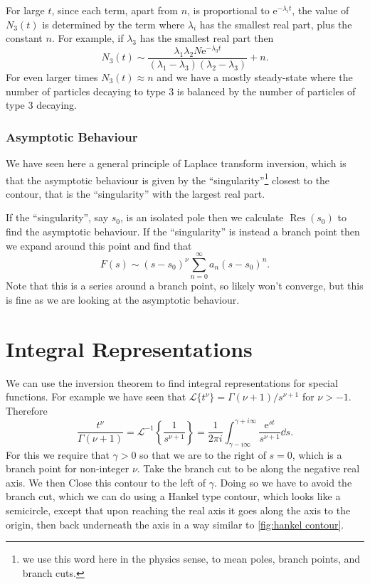 \documentclass[fleqn]{NotesClass}
\newcommand*{\e}{\mathrm{e}}
\DeclareMathOperator{\Res}{Res}
\newcommand*{\laplaceTransform}{\mathcal{L}}
\newcommand*{\inverseLaplaceTransform}{\laplaceTransform^{-1}}
\begin{document}
    For large \(t\), since each term, apart from \(n\), is proportional to \(\e^{-\lambda_it}\), the value of \(N_3(t)\) is determined by the term where \(\lambda_i\) has the smallest real part, plus the constant \(n\).
    For example, if \(\lambda_3\) has the smallest real part then 
    \begin{equation}
        N_3(t) \sim \frac{\lambda_1\lambda_2N\e^{-\lambda_3t}}{(\lambda_1 - \lambda_3)(\lambda_2 - \lambda_3)} + n.
    \end{equation}
    For even larger times \(N_3(t) \approx n\) and we have a mostly steady-state where the number of particles decaying to type 3 is balanced by the number of particles of type 3 decaying.
    
    \subsubsection{Asymptotic Behaviour}
    We have seen here a general principle of Laplace transform inversion, which is that the asymptotic behaviour is given by the \enquote{singularity}\footnote{we use this word here in the physics sense, to mean poles, branch points, and branch cuts.} closest to the contour, that is the \enquote{singularity} with the largest real part.
    
    If the \enquote{singularity}, say \(s_0\), is an isolated pole then we calculate \(\Res(s_0)\) to find the asymptotic behaviour.
    If the \enquote{singularity} is instead a branch point then we expand around this point and find that
    \begin{equation}
        F(s) \sim (s - s_0)^\nu \sum_{n=0}^{\infty} a_n(s - s_0)^n.
    \end{equation}
    Note that this is a series around a branch point, so likely won't converge, but this is fine as we are looking at the asymptotic behaviour.
    
    \section{Integral Representations}
    We can use the inversion theorem to find integral representations for special functions.
    For example we have seen that \(\laplaceTransform\{t^\nu\} = \Gamma(\nu + 1)/s^{\nu + 1}\) for \(\nu > -1\).
    Therefore
    \begin{equation}
        \frac{t^{\nu}}{\Gamma(\nu + 1)} = \inverseLaplaceTransform\left\{ \frac{1}{s^{\nu + 1}} \right\} = \frac{1}{2\pi i} \int_{\gamma - i\infty}^{\gamma + i\infty} \frac{\e^{st}}{s^{\nu + 1}} \dd{s}.
    \end{equation}
    For this we require that \(\gamma > 0\) so that we are to the right of \(s = 0\), which is a branch point for non-integer \(\nu\).
    Take the branch cut to be along the negative real axis.
    We then Close this contour to the left of \(\gamma\).
    Doing so we have to avoid the branch cut, which we can do using a Hankel type contour, which looks like a semicircle, except that upon reaching the real axis it goes along the axis to the origin, then back underneath the axis in a way similar to \cref{fig:hankel contour}.
    
\end{document}
